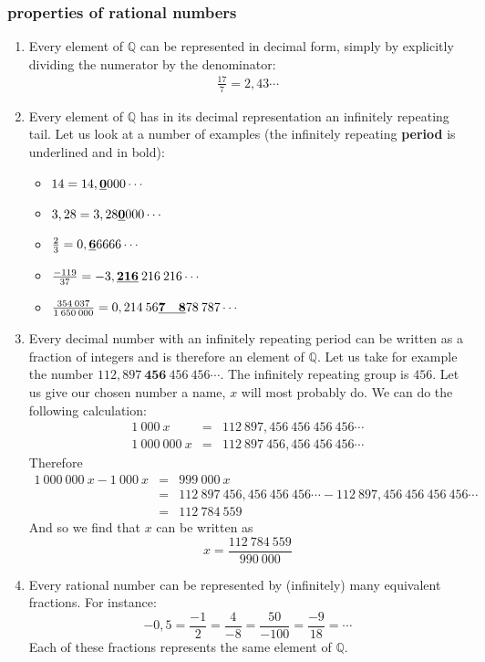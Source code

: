 \subsubsection{properties of rational numbers}

\begin{enumerate}

	\item Every element of $\mathbb{Q}$ can be represented in decimal form, simply by explicitly dividing the numerator by the denominator:
	\begin{eqnarray}
	 \frac{17}{7} = 2,43\cdots \nonumber
	\end{eqnarray}
\item Every element of $\mathbb{Q}$ has in its decimal representation an infinitely repeating tail. Let us look at a number of examples (the infinitely repeating \textbf{period} is underlined and in bold):
	\begin{itemize}
		\item $14 = 14,\textbf{\underline{0}}000\cdots$
		\item $3,28 = 3,28\textbf{\underline{0}}000\cdots$
		\item $\frac{2}{3} = 0,\textbf{\underline{6}}6666\cdots $
		\item $ \frac{-119}{37} = -3,\textbf{\underline{216}}\:216\:216 \cdots $
\item $ \frac{354 \: 037}{1\: 650 \:000} = 0,214 \: 56\textbf{\underline{7 \: 8}}78 \:787\cdots $ 
\end{itemize}
\item Every decimal number with an infinitely repeating period can be written as a fraction of integers and is therefore an element of $\mathbb{Q}$. Let us take for example the number $112,897\:\textbf{456}\:456\:456\cdots $. The infinitely repeating group is $456$. Let us give our chosen number a name, $x$ will most probably do. We can do the following calculation:
\begin{eqnarray}
1\: 000 \: x & = & 112\:897,456\:456\:456\:456\cdots \nonumber \\
1 \: 000 \: 000 \: x & = & 112\:897\:456,456\:456\:456\cdots \nonumber
\end{eqnarray}
Therefore
\begin{eqnarray}
1 \: 000 \: 000 \: x - 1\: 000 \: x & = & 999 \: 000 \: x \nonumber\\ 
 & = & 112\:897\:456,456\:456\:456\cdots - 112\:897,456\:456\:456\:456\cdots \nonumber\\
& = & 112 \: 784 \: 559 \nonumber
\end{eqnarray}
And so we find that $x$ can be written as
$$
x = \frac{112 \: 784 \: 559}{990\:000}
$$
\item Every rational number can be represented by (infinitely) many equivalent fractions. For instance:
$$
-0,5 = \frac{-1}{2}= \frac{4}{-8}= \frac{50}{-100}= \frac{-9}{18} = \cdots
$$
Each of these fractions represents the same element of $\mathbb{Q}$.
	

\end{enumerate}

